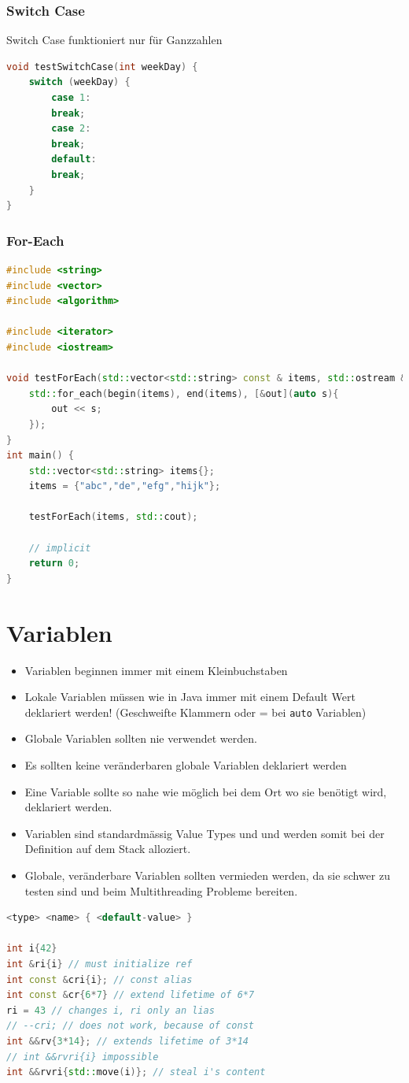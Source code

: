 \subsubsection{Switch Case}
Switch Case funktioniert nur für Ganzzahlen
\begin{lstlisting}[language=C++]
void testSwitchCase(int weekDay) {
	switch (weekDay) {
		case 1:
		break;
		case 2:
		break;
		default:
		break;
	}
}
\end{lstlisting}

\subsubsection{For-Each}
\begin{lstlisting}[language=C++]
#include <string>
#include <vector>
#include <algorithm>

#include <iterator>
#include <iostream>

void testForEach(std::vector<std::string> const & items, std::ostream & out) {
	std::for_each(begin(items), end(items), [&out](auto s){
		out << s;
	});
}
int main() {
	std::vector<std::string> items{};
	items = {"abc","de","efg","hijk"};
	
	testForEach(items, std::cout);
	
	// implicit
	return 0;
}
\end{lstlisting}


\section{Variablen}
\begin{itemize}
	\item Variablen beginnen immer mit einem Kleinbuchstaben 
	\item Lokale Variablen müssen wie in Java immer mit einem Default Wert deklariert werden! (Geschweifte Klammern oder = bei \lstinline|auto| Variablen)
	\item Globale Variablen sollten nie verwendet werden.
	\item Es sollten keine veränderbaren globale Variablen deklariert werden
	\item Eine Variable sollte so nahe wie möglich bei dem Ort wo sie benötigt wird, deklariert werden.
	\item Variablen sind standardmässig Value Types und und werden somit bei der Definition auf dem Stack alloziert.
	\item Globale, veränderbare Variablen sollten vermieden werden, da sie schwer zu testen sind und beim Multithreading Probleme bereiten.
\end{itemize}
\begin{lstlisting}[language=C++]
<type> <name> { <default-value> }

int i{42}
int &ri{i} // must initialize ref
int const &cri{i}; // const alias
int const &cr{6*7} // extend lifetime of 6*7
ri = 43 // changes i, ri only an lias
// --cri; // does not work, because of const
int &&rv{3*14}; // extends lifetime of 3*14
// int &&rvri{i} impossible
int &&rvri{std::move(i)}; // steal i's content
\end{lstlisting}

